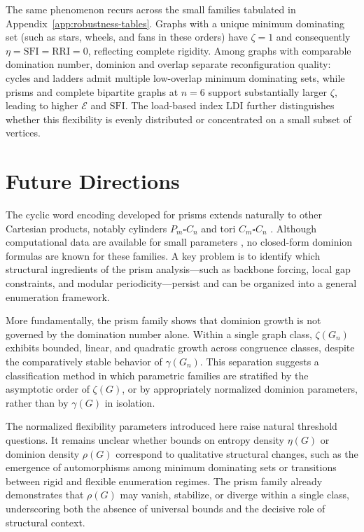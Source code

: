 \documentclass[11pt]{article}
\theoremstyle{plain}
\theoremstyle{definition}
\theoremstyle{remark}
\begin{document}
The same phenomenon recurs across the small families tabulated in
Appendix~\ref{app:robustness-tables}.  Graphs with a unique minimum dominating set
(such as stars, wheels, and fans in these orders) have $\zeta=1$ and consequently
$\eta=\mathrm{SFI}=\mathrm{RRI}=0$, reflecting complete rigidity.
Among graphs with comparable domination number, dominion and overlap separate
reconfiguration quality: cycles and ladders admit multiple low-overlap minimum dominating
sets, while prisms and complete bipartite graphs at $n=6$ support substantially larger
$\zeta$, leading to higher $\mathcal{E}$ and $\mathrm{SFI}$.
The load-based index $\mathrm{LDI}$ further distinguishes whether this flexibility is
evenly distributed or concentrated on a small subset of vertices.



\section{Future Directions}\label{sec:future}

The cyclic word encoding developed for prisms extends naturally to other Cartesian
products, notably cylinders $P_m\square C_n$ and tori $C_m\square C_n$
\cite{imrich-klavzar-rall-2008}.  Although computational data are available for small
parameters \cite{mertens-2024}, no closed-form dominion formulas are known for these
families.  A key problem is to identify which structural ingredients of the prism
analysis—such as backbone forcing, local gap constraints, and modular periodicity—persist
and can be organized into a general enumeration framework.

More fundamentally, the prism family shows that dominion growth is not governed by the
domination number alone.  Within a single graph class, $\zeta(G_n)$ exhibits bounded,
linear, and quadratic growth across congruence classes, despite the comparatively stable
behavior of $\gamma(G_n)$.  This separation suggests a classification method in which
parametric families are stratified by the asymptotic order of $\zeta(G)$, or by
appropriately normalized dominion parameters, rather than by $\gamma(G)$ in isolation.

The normalized flexibility parameters introduced here raise natural threshold questions.
It remains unclear whether bounds on entropy density $\eta(G)$ or dominion density
$\rho(G)$ correspond to qualitative structural changes, such as the emergence of
automorphisms among minimum dominating sets or transitions between rigid and flexible
enumeration regimes.  The prism family already demonstrates that $\rho(G)$ may vanish,
stabilize, or diverge within a single class, underscoring both the absence of universal
bounds and the decisive role of structural context.
\end{document}
